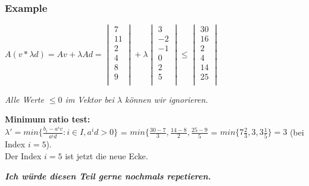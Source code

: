 \subsubsection{Example}
$A(v*\lambda d) = Av + \lambda Ad = \begin{vmatrix}
7 \\ 11 \\ 2 \\ 4 \\ 8 \\ 9 \\
\end{vmatrix} + \lambda 
\begin{vmatrix}
3 \\ -2 \\ -1 \\ 0 \\ 2 \\ 5 \\
\end{vmatrix} \leq
\begin{vmatrix}
30 \\ 16 \\ 2 \\ 4 \\ 14 \\ 25 \\
\end{vmatrix}$

\textit{Alle Werte $\leq 0$ im Vektor bei $\lambda$ können wir ignorieren.}

\textbf{Minimum ratio test:} \\
$\lambda ' =  min\{\frac{b_i - a^iv}{a^id} : i \in I, a^id > 0\}$ = $min\{\frac{30-7}{3},\frac{14-8}{2},\frac{25-9}{5}$ = $min\{7\frac{2}{3}, 3, 3 \frac{1}{5}\} = 3$ (bei Index $i = 5$). \\
Der Index $i = 5$ ist jetzt die neue Ecke.

\textbf{\textit{Ich würde diesen Teil gerne nochmals repetieren.}}

\clearpage